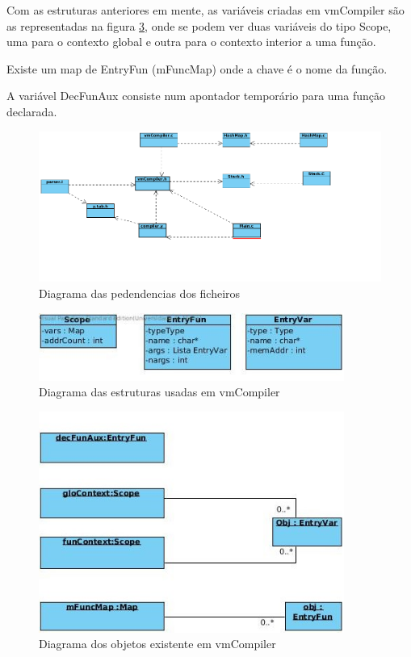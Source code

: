 \documentclass[a4paper,10pt]{report}
\begin{document}
    Com as estruturas anteriores em mente, as variáveis criadas em vmCompiler são as representadas na figura \ref{fig:objs}, onde se podem ver duas variáveis do tipo Scope, uma para o contexto global e outra para o contexto interior a uma função.

    Existe um map de EntryFun (mFuncMap) onde a chave é o nome da função.
    
    A variável DecFunAux consiste num apontador temporário para uma função declarada.

\begin{figure}
\centering
\includegraphics[width=15cm]{imagens/dependecias.png}
\caption{Diagrama das pedendencias dos ficheiros}
\label{fig:dependencias}
\end{figure}

\begin{figure}
\centering
\includegraphics[width=10cm]{imagens/estruturas.jpg}
\caption{Diagrama das estruturas usadas em vmCompiler}
\label{fig:struct}
\end{figure}

\begin{figure}
\centering
\includegraphics[width=10cm]{imagens/objetos.jpg}
\caption{Diagrama dos objetos existente em vmCompiler}
\label{fig:objs}
\end{figure}
\end{document}
